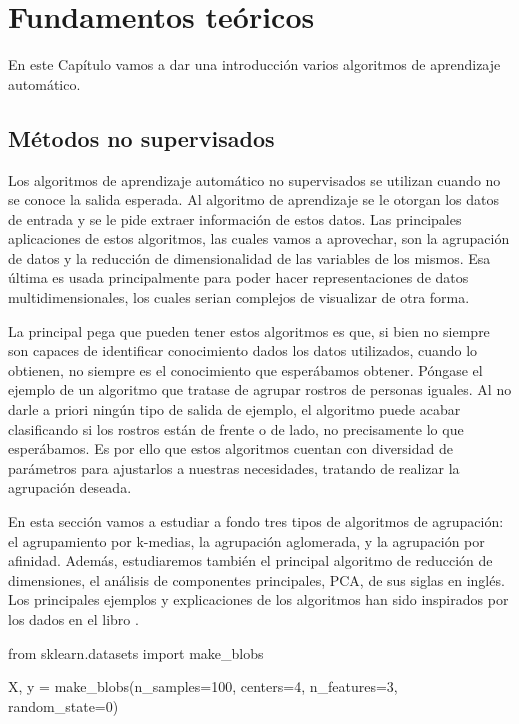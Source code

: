 \chapter{Fundamentos teóricos} \label{chap:fundamentos-teoricos}

En este Capítulo vamos a dar una introducción varios algoritmos de aprendizaje automático.

\section{Métodos no supervisados}

Los algoritmos de aprendizaje automático no supervisados se utilizan cuando no se conoce la salida esperada. Al algoritmo de aprendizaje se le otorgan los datos de entrada y se le pide extraer información de estos datos. Las principales aplicaciones de estos algoritmos, las cuales vamos a aprovechar, son la agrupación de datos y la reducción de dimensionalidad de las variables de los mismos. Esa última es usada principalmente para poder hacer representaciones de datos multidimensionales, los cuales serian complejos de visualizar de otra forma.

La principal pega que pueden tener estos algoritmos es que, si bien no siempre son capaces de identificar conocimiento dados los datos utilizados, cuando lo obtienen, no siempre es el conocimiento que esperábamos obtener. Póngase el ejemplo de un algoritmo que tratase de agrupar rostros de personas iguales. Al no darle a priori ningún tipo de salida de ejemplo, el algoritmo puede acabar clasificando si los rostros están de frente o de lado, no precisamente lo que esperábamos. Es por ello que estos algoritmos cuentan con diversidad de parámetros para ajustarlos a nuestras necesidades, tratando de realizar la agrupación deseada.

En esta sección vamos a estudiar a fondo tres tipos de algoritmos de agrupación: el agrupamiento por k-medias, la agrupación aglomerada, y la agrupación por afinidad. Además, estudiaremos también el principal algoritmo de reducción de dimensiones, el análisis de componentes principales, PCA, de sus siglas en inglés. Los principales ejemplos y explicaciones de los algoritmos han sido inspirados por los dados en el libro \cite[Introduction to Machine Learning with Python]{machine}.

\begin{mypython}[float={h},caption={Generar datos artificiales de prueba.}]
  from sklearn.datasets import make_blobs

  X, y = make_blobs(n_samples=100, centers=4,
                  n_features=3, random_state=0)
\end{mypython}

